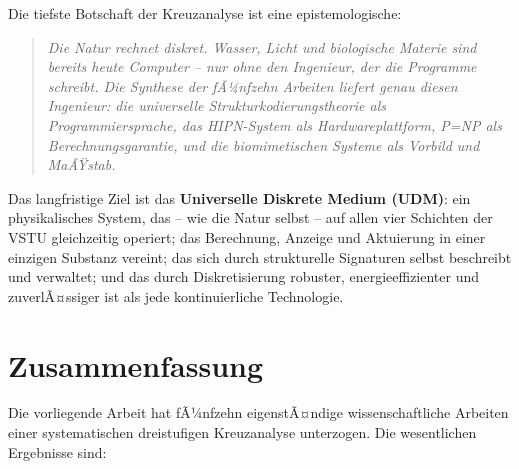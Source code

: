 ﻿\documentclass[a4paper,12pt]{scrreprt}
\theoremstyle{definition}
\begin{document}
Die tiefste Botschaft der Kreuzanalyse ist eine epistemologische:

\begin{quote}
  \itshape
  Die Natur rechnet diskret. Wasser, Licht und biologische Materie sind
  bereits heute Computer -- nur ohne den Ingenieur, der die Programme
  schreibt. Die Synthese der fÃ¼nfzehn Arbeiten liefert genau diesen
  Ingenieur: die universelle Strukturkodierungstheorie als Programmiersprache,
  das HIPN-System als Hardwareplattform, P=NP als Berechnungsgarantie,
  und die biomimetischen Systeme als Vorbild und MaÃŸstab.
\end{quote}

Das langfristige Ziel ist das \textbf{Universelle Diskrete Medium (UDM)}:
ein physikalisches System, das -- wie die Natur selbst -- auf allen vier
Schichten der VSTU gleichzeitig operiert; das Berechnung, Anzeige und
Aktuierung in einer einzigen Substanz vereint; das sich durch strukturelle
Signaturen selbst beschreibt und verwaltet; und das durch Diskretisierung
robuster, energieeffizienter und zuverlÃ¤ssiger ist als jede kontinuierliche
Technologie.

\section{Zusammenfassung}
\label{sec:zusammenfassung}

Die vorliegende Arbeit hat fÃ¼nfzehn eigenstÃ¤ndige wissenschaftliche
Arbeiten einer systematischen dreistufigen Kreuzanalyse unterzogen.
Die wesentlichen Ergebnisse sind:
\end{document}

